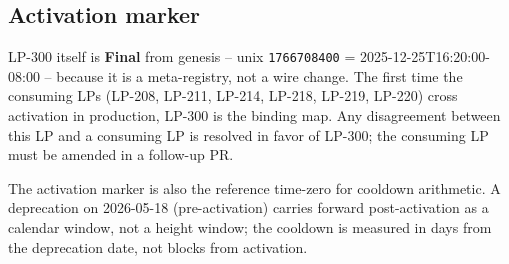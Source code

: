 \subsection{Activation marker}

LP-300 itself is \textbf{Final} from genesis -- unix
\texttt{1766708400} = 2025-12-25T16:20:00-08:00 -- because it is a
meta-registry, not a wire change. The first time the consuming LPs
(LP-208, LP-211, LP-214, LP-218, LP-219, LP-220) cross activation in
production, LP-300 is the binding map. Any disagreement between this
LP and a consuming LP is resolved in favor of LP-300; the consuming
LP must be amended in a follow-up PR.

The activation marker is also the reference time-zero for cooldown
arithmetic. A deprecation on 2026-05-18 (pre-activation) carries
forward post-activation as a calendar window, not a height window;
the cooldown is measured in days from the deprecation date, not
blocks from activation.
